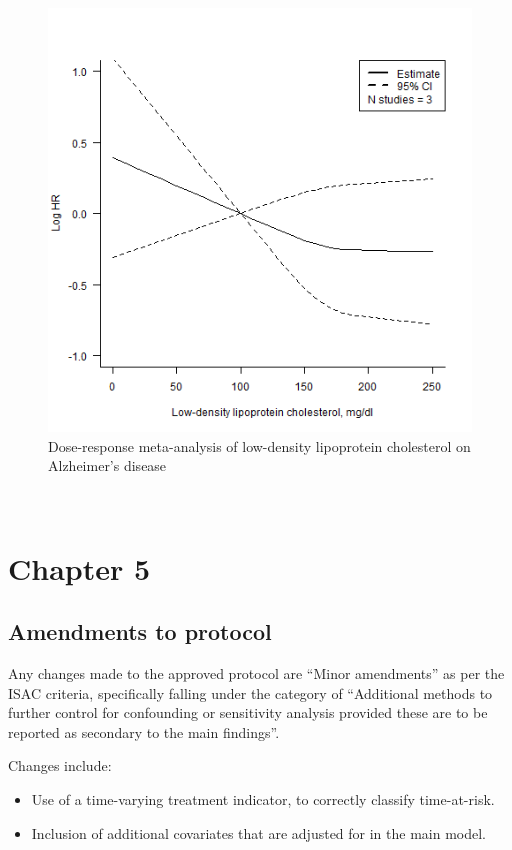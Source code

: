 \documentclass[a4paper, twoside]{templates/ociamthesis}
\providecommand{\tightlist}{%
  \setlength{\itemsep}{0pt}\setlength{\parskip}{0pt}}
\begin{document}
\begin{figure}[H]

{\centering \includegraphics[width=0.6\linewidth]{figures/sys-rev/dr_AD_LDL} 

}

\caption[shortcap]{Dose-response meta-analysis of low-density lipoprotein cholesterol on Alzheimer's disease}\label{fig:drAdLDL}
\end{figure}

~

\hypertarget{appendix-cprd-analysis}{%
\section{Chapter 5}\label{appendix-cprd-analysis}}

\hypertarget{appendix-cprd-amendments}{%
\subsection{Amendments to protocol}\label{appendix-cprd-amendments}}

Any changes made to the approved protocol are ``Minor amendments'' as per the ISAC criteria, specifically falling under the category of ``Additional methods to further control for confounding or sensitivity analysis provided these are to be reported as secondary to the main findings''.

Changes include:

\begin{itemize}
\tightlist
\item
  Use of a time-varying treatment indicator, to correctly classify time-at-risk.
\item
  Inclusion of additional covariates that are adjusted for in the main model.
\end{itemize}
\end{document}
